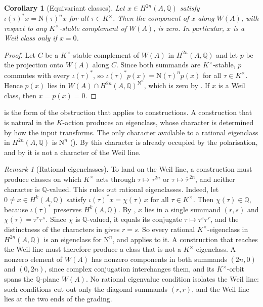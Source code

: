 \documentclass[11pt,reqno]{amsart}
\theoremstyle{plain}
\newtheorem{corollary}[theorem]{Corollary}
\theoremstyle{definition}
\theoremstyle{remark}
\newtheorem{remark}[theorem]{Remark}
\newcommand{\QQ}{\mathbb{Q}}
\newcommand{\HW}{W}                      %
\newcommand{\Nm}{\mathrm{N}}             %
\newcommand{\Kx}{K^{\times}}
\newcommand{\bbar}[1]{\overline{#1}}
\begin{document}
\begin{corollary}[Equivariant classes]%
\label{cor:equivariant}
Let $x\in H^{2n}(A,\QQ)$ satisfy $\iota(\tau)^{*}x=\Nm(\tau)^{n}x$ for all
$\tau\in\Kx$. Then the component of $x$ along $\HW(A)$, with respect to any
$\Kx$-stable complement of $\HW(A)$, is zero. In particular, $x$ is a Weil
class only if $x=0$.
\end{corollary}

\begin{proof}
Let $C$ be a $\Kx$-stable complement of $\HW(A)$ in $H^{2n}(A,\QQ)$ and let
$p$ be the projection onto $\HW(A)$ along $C$. Since both summands are
$\Kx$-stable, $p$ commutes with every $\iota(\tau)^{*}$, so
$\iota(\tau)^{*}p(x)=\Nm(\tau)^{n}p(x)$ for all $\tau\in\Kx$. Hence $p(x)$
lies in $\HW(A)\cap H^{2n}(A,\QQ)^{\Nm^{n}}$, which is zero by
. If $x$ is a Weil class, then $x=p(x)=0$.
\end{proof}

 is the form of the obstruction that applies to
constructions. A construction that is natural in the $K$-action produces an
eigenclass, whose character is determined by how the input transforms. The
only character available to a rational eigenclass in $H^{2n}(A,\QQ)$ is
$\Nm^{n}$ (). By  this character is
already occupied by the polarisation, and by  it is not
a character of the Weil line.

\begin{remark}[Rational eigenclasses]\label{rem:rightcharacter}
To land on the Weil line, a construction must produce classes on which $\Kx$
acts through $\tau\mapsto\tau^{2n}$ or $\tau\mapsto\bbar{\tau}^{\,2n}$, and
neither character is $\QQ$-valued. This rules out rational eigenclasses.
Indeed, let $0\ne x\in H^{k}(A,\QQ)$ satisfy $\iota(\tau)^{*}x=\chi(\tau)\,x$
for all $\tau\in\Kx$. Then $\chi(\tau)\in\QQ$, because $\iota(\tau)^{*}$
preserves $H^{k}(A,\QQ)$. By , $x$ lies in a single summand
$(r,s)$ and $\chi(\tau)=\tau^{r}\bbar{\tau}^{\,s}$. Since $\chi$ is
$\QQ$-valued, it equals its conjugate $\tau\mapsto\tau^{s}\bbar{\tau}^{\,r}$,
and the distinctness of the characters in  gives $r=s$. So
every rational $\Kx$-eigenclass in $H^{2n}(A,\QQ)$ is an eigenclass for
$\Nm^{n}$, and  applies to it. A construction that
reaches the Weil line must therefore produce a class that is not a
$\Kx$-eigenclass. A nonzero element of $\HW(A)$ has nonzero components in both
summands $(2n,0)$ and $(0,2n)$, since complex conjugation interchanges them,
and its $\Kx$-orbit spans the $\QQ$-plane $\HW(A)$. No rational eigenvalue
condition isolates the Weil line: such conditions cut out only the diagonal
summands $(r,r)$, and the Weil line lies at the two ends of the grading.
\end{remark}
\end{document}

